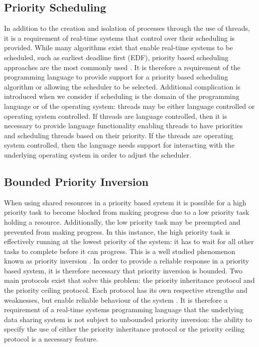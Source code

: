 \subsection{Priority Scheduling}
In addition to the creation and isolation of processes through the use of 
threads, it is a requirement of real-time systems 
that control over their scheduling is provided. 
While many algorithms exist that enable real-time systems to be scheduled, such 
as earliest deadline first (EDF), priority based scheduling approaches are the 
most commonly used
\cite{real-time-systems}. 
It is therefore a requirement of the programming language to provide support 
for a priority based scheduling algorithm or allowing the scheduler to be 
selected. Additional complication is introduced when we consider if scheduling 
is the domain of the programming language or of the operating system:
threads may be either language controlled or operating system controlled. 
If threads are language controlled, then it is necessary to provide 
language functionality enabling threads to have priorities and scheduling threads 
based on their priority.
If the threads are operating system controlled, then the language needs 
support for interacting with the underlying operating system in order to 
adjust the scheduler. 

\subsection{Bounded Priority Inversion}
When using shared resources in a priority based system it is possible for 
a high priority task to become blocked from making progress due to a low
priority task holding a resource. Additionally, the low priority task may be 
preempted and prevented from making progress. In this instance, the high priority task is 
effectively running at the lowest priority of the system: it has to wait for all other 
tasks to complete before it can progress. This is a well studied phenomenon known 
as priority inversion 
\cite{real-time-systems}. 
In order to provide a reliable response in a priority based system, it is 
therefore necessary that priority inversion is bounded.
Two main protocols exist that solve this problem: the priority inheritance protocol 
and the priority ceiling protocol. Each protocol has its own respective 
strengths and weaknesses, but enable reliable behaviour of the system 
\cite{mall2009real}.
It is therefore a requirement of a real-time systems programming language 
that the underlying data sharing system is not subject to unbounded priority 
inversion: the ability to specify the use of either the priority inheritance 
protocol or the priority ceiling protocol is a necessary feature.  

